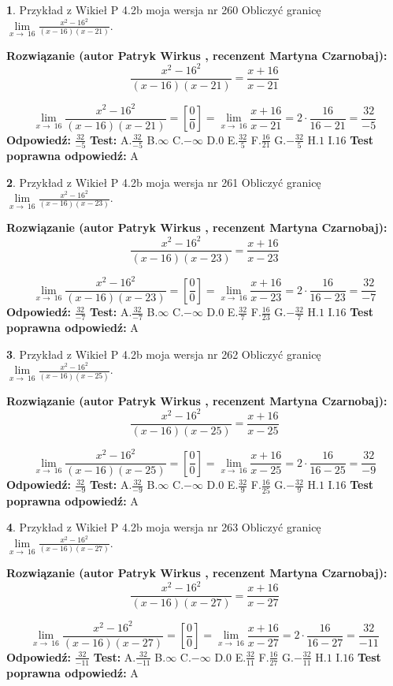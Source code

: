 \documentclass[12pt, a4paper]{article}
\theoremstyle{definition} %
\newtheorem{zad}{}
\newcommand{\zadStart}[1]{\begin{zad}#1\newline}
\newcommand{\zadStop}{\end{zad}}
\newcommand{\rozwStart}[2]{\noindent \textbf{Rozwiązanie (autor #1 , recenzent #2): }\newline}
\newcommand{\rozwStop}{\newline}
\newcommand{\odpStart}{\noindent \textbf{Odpowiedź:}\newline}
\newcommand{\odpStop}{\newline}
\newcommand{\testStart}{\noindent \textbf{Test:}\newline}
\newcommand{\testStop}{\newline}
\newcommand{\kluczStart}{\noindent \textbf{Test poprawna odpowiedź:}\newline}
\newcommand{\kluczStop}{\newline}
\begin{document}
\zadStart{Przykład z Wikieł P 4.2b moja wersja nr 260}
Obliczyć granicę $\lim\limits_{x\to\ 16}\frac{x^{2}-16^{2}}{(x-16)(x-21)}$.
\zadStop
\rozwStart{Patryk Wirkus}{Martyna Czarnobaj}
$$\frac{x^{2}-16^{2}}{(x-16)(x-21)}=\frac{x+16}{x-21}$$

$$\lim\limits_{x\to\ 16}\frac{x^{2}-16^{2}}{(x-16)(x-21)}=[\frac{0}{0}]=\lim\limits_{x\to\ 16}\frac{x+16}{x-21}=2 \cdot \frac{16}{16-21} = \frac{32}{-5}$$
\rozwStop
\odpStart
$\frac{32}{-5}$
\odpStop
\testStart
A.$\frac{32}{-5}$
B.$\infty$
C.$-\infty$
D.$0$
E.$\frac{32}{5}$
F.$\frac{16}{21}$
G.$-\frac{32}{5}$
H.$1$
I.$16$
\testStop
\kluczStart
A
\kluczStop



\zadStart{Przykład z Wikieł P 4.2b moja wersja nr 261}
Obliczyć granicę $\lim\limits_{x\to\ 16}\frac{x^{2}-16^{2}}{(x-16)(x-23)}$.
\zadStop
\rozwStart{Patryk Wirkus}{Martyna Czarnobaj}
$$\frac{x^{2}-16^{2}}{(x-16)(x-23)}=\frac{x+16}{x-23}$$

$$\lim\limits_{x\to\ 16}\frac{x^{2}-16^{2}}{(x-16)(x-23)}=[\frac{0}{0}]=\lim\limits_{x\to\ 16}\frac{x+16}{x-23}=2 \cdot \frac{16}{16-23} = \frac{32}{-7}$$
\rozwStop
\odpStart
$\frac{32}{-7}$
\odpStop
\testStart
A.$\frac{32}{-7}$
B.$\infty$
C.$-\infty$
D.$0$
E.$\frac{32}{7}$
F.$\frac{16}{23}$
G.$-\frac{32}{7}$
H.$1$
I.$16$
\testStop
\kluczStart
A
\kluczStop



\zadStart{Przykład z Wikieł P 4.2b moja wersja nr 262}
Obliczyć granicę $\lim\limits_{x\to\ 16}\frac{x^{2}-16^{2}}{(x-16)(x-25)}$.
\zadStop
\rozwStart{Patryk Wirkus}{Martyna Czarnobaj}
$$\frac{x^{2}-16^{2}}{(x-16)(x-25)}=\frac{x+16}{x-25}$$

$$\lim\limits_{x\to\ 16}\frac{x^{2}-16^{2}}{(x-16)(x-25)}=[\frac{0}{0}]=\lim\limits_{x\to\ 16}\frac{x+16}{x-25}=2 \cdot \frac{16}{16-25} = \frac{32}{-9}$$
\rozwStop
\odpStart
$\frac{32}{-9}$
\odpStop
\testStart
A.$\frac{32}{-9}$
B.$\infty$
C.$-\infty$
D.$0$
E.$\frac{32}{9}$
F.$\frac{16}{25}$
G.$-\frac{32}{9}$
H.$1$
I.$16$
\testStop
\kluczStart
A
\kluczStop



\zadStart{Przykład z Wikieł P 4.2b moja wersja nr 263}
Obliczyć granicę $\lim\limits_{x\to\ 16}\frac{x^{2}-16^{2}}{(x-16)(x-27)}$.
\zadStop
\rozwStart{Patryk Wirkus}{Martyna Czarnobaj}
$$\frac{x^{2}-16^{2}}{(x-16)(x-27)}=\frac{x+16}{x-27}$$

$$\lim\limits_{x\to\ 16}\frac{x^{2}-16^{2}}{(x-16)(x-27)}=[\frac{0}{0}]=\lim\limits_{x\to\ 16}\frac{x+16}{x-27}=2 \cdot \frac{16}{16-27} = \frac{32}{-11}$$
\rozwStop
\odpStart
$\frac{32}{-11}$
\odpStop
\testStart
A.$\frac{32}{-11}$
B.$\infty$
C.$-\infty$
D.$0$
E.$\frac{32}{11}$
F.$\frac{16}{27}$
G.$-\frac{32}{11}$
H.$1$
I.$16$
\testStop
\kluczStart
A
\kluczStop
\end{document}
